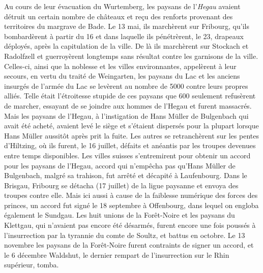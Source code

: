 \documentclass[french,twoside]{book} %
\begin{document}
Au cours de leur évacuation du Wurtemberg, les paysans de l’\emph{Hegau} avaient détruit un certain nombre de châteaux et reçu des renforts provenant des territoires du margrave de Bade. Le 13 mai, ils marchèrent sur Fribourg, qu’ils bombardèrent à partir du 16 et dans laquelle ils pénétrèrent, le 23, drapeaux déployés, après la capitulation de la ville. De là ils marchèrent sur Stockach et Radolfzell et guerroyèrent longtemps sans résultat contre les garnisons de la ville. Celles-ci, ainsi que la noblesse et les villes environnantes, appelèrent à leur secours, en vertu du traité de Weingarten, les paysans du Lac et les anciens insurgés de l’armée du Lac se levèrent au nombre de 5000 contre leurs propres alliés. Telle était l’étroitesse stupide de ces paysans que 600 seulement refusèrent de marcher, essayant de se joindre aux hommes de l’Hegau et furent massacrés. Mais les paysans de l’Hegau, à l’instigation de Hans Müller de Bulgenbach qui avait été acheté, avaient levé le siège et s’étaient dispersés pour la plupart lorsque Hans Müller aussitôt après prit la fuite. Les autres se retranchèrent sur les pentes d’Hiltzing, où ils furent, le 16 juillet, défaits et anéantis par les troupes devenues entre temps disponibles. Les villes suisses s’entremirent pour obtenir un accord pour les paysans de l’Hegau, accord qui n’empêcha pas qu’Hans Müller de Bulgenbach, malgré sa trahison, fut arrêté et décapité à Laufenbourg. Dans le Brisgau, Fribourg se détacha (17 juillet) de la ligue paysanne et envoya des troupes contre elle. Mais ici aussi à cause de la faiblesse numérique des forces des princes, un accord fut signé le 18 septembre à Offenbourg, dans lequel on engloba également le Sundgau. Les huit unions de la Forêt-Noire et les paysans du Klettgau, qui n’avaient pas encore été désarmés, furent encore une fois poussés à l’insurrection par la tyrannie du comte de Soultz, et battus en octobre. Le 13 novembre les paysans de la Forêt-Noire furent contraints de signer un accord, et le 6 décembre Waldshut, le dernier rempart de l’insurrection sur le Rhin supérieur, tomba.\par
\end{document}
